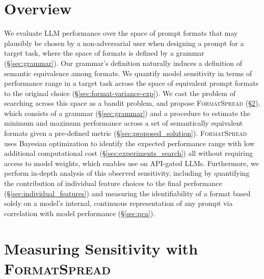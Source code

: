 \documentclass{article} %
\newcommand{\toolname}[1]{}
\renewcommand{\toolname}[1]{{\color{black} \textsc{FormatSpread}}}
\begin{document}
\section{Overview}
\vspace{-2mm}
We evaluate LLM performance over the space of prompt formats that may plausibly be chosen by a non-adversarial user when designing a prompt for a target task, where the space of formats is defined by a grammar (\S\ref{sec:grammar}). Our grammar's definition naturally induces a definition of semantic equivalence among formats. 
We quantify model sensitivity in terms of performance range in a target task across the space of equivalent prompt formats to the original choice (\S\ref{sec:format-variance-exp}).
We cast the problem of searching across this space as a bandit problem, and propose \toolname{} (\S\ref{sec:formatspread}), which
 consists of a grammar (\S\ref{sec:grammar}) and a procedure to estimate the minimum and maximum performance across a set of semantically equivalent formats given a pre-defined metric (\S\ref{sec:proposed_solution}).
\toolname{} uses Bayesian optimization 
to identify the expected performance range with low additional computational cost (\S\ref{sec:experiments_search}) all without requiring access to model weights, which enables use on API-gated LLMs. Furthermore, we perform in-depth analysis of this observed sensitivity, including by quantifying the contribution of individual feature choices to the final performance (\S\ref{sec:individual_features})
and measuring the identifiability of a format based solely on a model's internal, continuous representation of any prompt via correlation with model performance (\S\ref{sec:pca}).

\vspace{-2mm}
\section{Measuring Sensitivity with \toolname{}}\label{sec:formatspread}
\vspace{-1.5mm}
\end{document}
